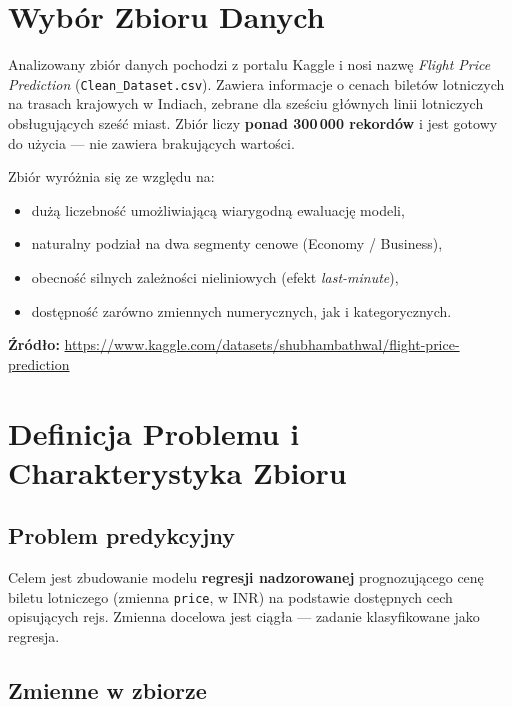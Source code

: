 \documentclass[12pt,a4paper]{article}
\begin{document}
	\section{Wybór Zbioru Danych}
	
	Analizowany zbiór danych pochodzi z portalu Kaggle i nosi nazwę
	\textit{Flight Price Prediction} (\texttt{Clean\_Dataset.csv}).
	Zawiera informacje o cenach biletów lotniczych na trasach krajowych w Indiach,
	zebrane dla sześciu głównych linii lotniczych obsługujących sześć miast.
	Zbiór liczy \textbf{ponad 300\,000 rekordów} i jest gotowy do użycia ---
	nie zawiera brakujących wartości.
	
	Zbiór wyróżnia się ze względu na:
	\begin{itemize}
		\item dużą liczebność umożliwiającą wiarygodną ewaluację modeli,
		\item naturalny podział na dwa segmenty cenowe (Economy / Business),
		\item obecność silnych zależności nieliniowych (efekt \textit{last-minute}),
		\item dostępność zarówno zmiennych numerycznych, jak i kategorycznych.
	\end{itemize}
	
	\noindent\textbf{Źródło:}
	\url{https://www.kaggle.com/datasets/shubhambathwal/flight-price-prediction}
	
	\section{Definicja Problemu i Charakterystyka Zbioru}
	
	\subsection{Problem predykcyjny}
	
	Celem jest zbudowanie modelu \textbf{regresji nadzorowanej} prognozującego cenę
	biletu lotniczego (zmienna \texttt{price}, w INR) na podstawie dostępnych cech
	opisujących rejs. Zmienna docelowa jest ciągła --- zadanie klasyfikowane jako
	regresja.
	
	\subsection{Zmienne w zbiorze}
	
\end{document}
